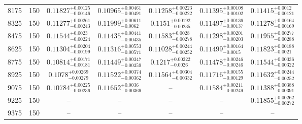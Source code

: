 \documentclass[twocolumn]{aastex63}
\begin{document}
\begin{table*}[ht!]
\begin{tabular}{ccccccc}
8175     &      150 &  $0.11827^{+0.00125}_{-0.00146}$ &  $0.10965^{+0.00461}_{-0.00491}$ &  $0.11258^{+0.00223}_{-0.00222}$ &  $0.11395^{+0.00108}_{-0.00102}$ &   $0.11415^{+0.0012}_{-0.00121}$ \\
8325     &      150 &  $0.11277^{+0.00261}_{-0.00243}$ &   $0.11999^{+0.00611}_{-0.0062}$ &   $0.1151^{+0.00192}_{-0.00235}$ &  $0.11497^{+0.00136}_{-0.00137}$ &  $0.11278^{+0.00164}_{-0.00169}$ \\
8475     &      150 &   $0.11544^{+0.0023}_{-0.00224}$ &  $0.11435^{+0.00441}_{-0.00435}$ &   $0.11583^{+0.0028}_{-0.00278}$ &  $0.11298^{+0.00201}_{-0.00203}$ &  $0.11955^{+0.00277}_{-0.00288}$ \\
8625     &      150 &  $0.11304^{+0.00204}_{-0.00199}$ &  $0.11316^{+0.00553}_{-0.00571}$ &  $0.11028^{+0.00244}_{-0.00252}$ &   $0.11499^{+0.00164}_{-0.0015}$ &   $0.11823^{+0.00188}_{-0.0021}$ \\
8775     &      150 &  $0.10814^{+0.00171}_{-0.00181}$ &  $0.11449^{+0.00347}_{-0.00359}$ &    $0.1217^{+0.00222}_{-0.0026}$ &  $0.11478^{+0.00246}_{-0.00246}$ &  $0.11544^{+0.00336}_{-0.00322}$ \\
8925     &      150 &   $0.1078^{+0.00269}_{-0.00279}$ &  $0.11522^{+0.00374}_{-0.00362}$ &  $0.11564^{+0.00304}_{-0.00332}$ &  $0.11716^{+0.00155}_{-0.00129}$ &  $0.11632^{+0.00244}_{-0.00252}$ \\
9075     &      150 &  $0.10784^{+0.00225}_{-0.00236}$ &   $0.11652^{+0.0036}_{-0.00369}$ &                              -- &  $0.11584^{+0.00211}_{-0.00249}$ &  $0.11388^{+0.00388}_{-0.00391}$ \\
9225     &      150 &                              -- &                              -- &                              -- &                              -- &  $0.11855^{+0.00262}_{-0.00272}$ \\
9375     &      150 &                              -- &                              -- &                              -- &                              -- &                              -- \\ \hline
\end{tabular}
\end{table*}
\end{document}
